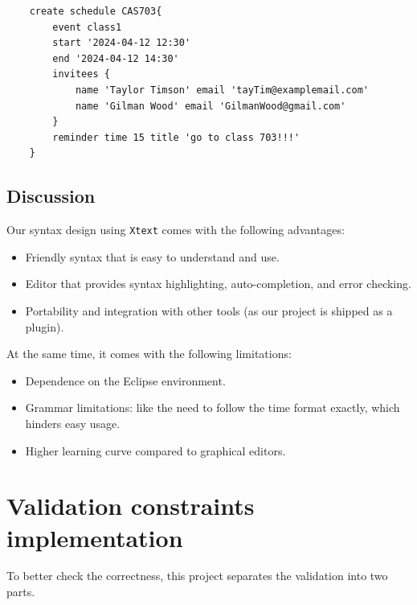 \documentclass[12pt, letterpaper, twoside]{article}
\begin{document}
\begin{verbatim}
    create schedule CAS703{
        event class1 
        start '2024-04-12 12:30'
        end '2024-04-12 14:30'
        invitees {
            name 'Taylor Timson' email 'tayTim@examplemail.com'
            name 'Gilman Wood' email 'GilmanWood@gmail.com'
        }
        reminder time 15 title 'go to class 703!!!'
    }
\end{verbatim}

\subsection{Discussion}
Our syntax design using \texttt{Xtext} comes with the following advantages:
\begin{itemize}
    \item Friendly syntax that is easy to understand and use.
    \item Editor that provides syntax highlighting, auto-completion, and error checking.
    \item Portability and integration with other tools (as our project is shipped as a plugin). 
\end{itemize}
At the same time, it comes with the following limitations:
\begin{itemize}
    \item Dependence on the Eclipse environment.
    \item Grammar limitations: like the need to follow the time format exactly, which hinders easy usage.
    \item Higher learning curve compared to graphical editors.
\end{itemize}


\newpage
\section{Validation constraints implementation}
To better check the correctness, this project separates the validation into two parts.
\end{document}

